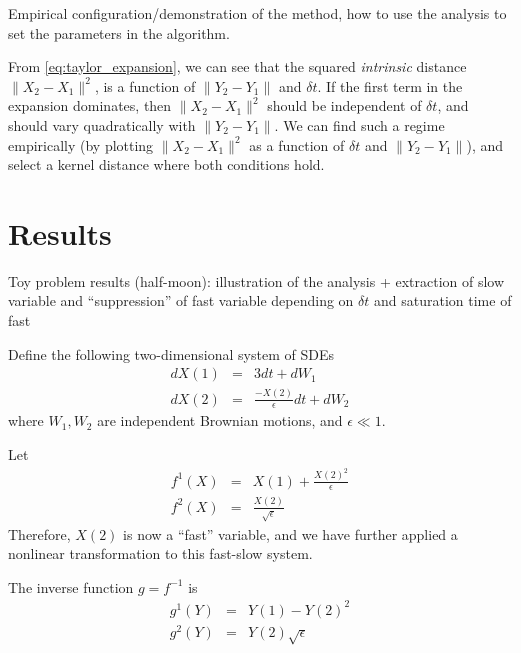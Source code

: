 \documentclass[1p]{elsarticle}
\begin{document}
Empirical configuration/demonstration of the method, how to use the analysis to set the parameters in the algorithm.

From \eqref{eq:taylor_expansion}, we can see that the squared {\em intrinsic} distance $\| X_2 - X_1 \|^2$, is a function of $\|Y_2 - Y_1\|$ and $\delta t$. 
%
If the first term in the expansion dominates, then $\|X_2 - X_1 \|^2$ should be independent of $\delta t$, and should vary quadratically with $\| Y_2 - Y_1\|$. 
%
We can find such a regime empirically (by plotting $\| X_2 - X_1 \|^2$ as a function of $\delta t$ and $\|Y_2 - Y_1\|$), and select a kernel distance where both conditions hold.

\section{Results}

 Toy problem results (half-moon): illustration of the analysis + extraction of slow variable and ``suppression'' of fast variable depending on $\delta t$ and saturation time of fast
 
 Define the following two-dimensional system of SDEs
\begin{eqnarray} \label{eq:init_data}
dX(1) &=& 3 dt + dW_1 \\ 
dX(2) &=& \frac{-X(2)}{\epsilon} dt + dW_2 
\end{eqnarray}
where $W_1, W_2$ are independent Brownian motions, and $\epsilon \ll 1$.

Let
\begin{eqnarray}\label{eq:transformed_data}
f^1(X) &=& X(1) + \frac{ X(2)^2}{\epsilon} \\
f^2(X) &=& \frac{X(2)}{\sqrt{\epsilon}}
\end{eqnarray}
Therefore, $X(2)$ is now a ``fast'' variable, and we have further applied a nonlinear transformation to this fast-slow system. 

The inverse function $g = f^{-1}$ is
\begin{eqnarray}
g^1(Y) &=& Y(1) - Y(2)^2 \\
g^2(Y) &=& Y(2) \sqrt{\epsilon}
\end{eqnarray}
\end{document}

